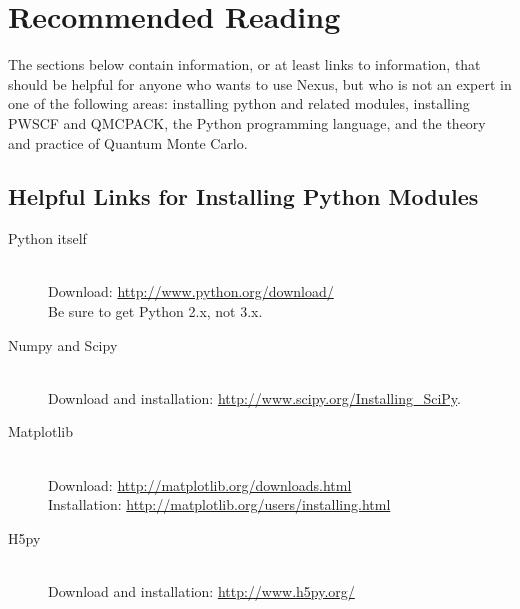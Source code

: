 \documentclass[oneside,11pt]{memoir}
\numberwithin{equation}{section}
\newcommand{\bu}[1]{\textbf{\underline{#1}}}
\begin{document}






\pagebreak
\chapter{Recommended Reading} \label{sec:reading}
The sections below contain information, or at least links to information, 
that should be helpful for anyone who wants to use Nexus, but who 
is not an expert in one of the following areas: installing python and related 
modules, installing PWSCF and QMCPACK, the Python programming language, and 
the theory and practice of Quantum Monte Carlo.  


\section{Helpful Links for Installing Python Modules} \label{sec:install_python}
\begin{description}
  \item[Python itself] \hfill \\
    Download: \url{http://www.python.org/download/}\\  
    Be sure to get Python 2.x, not 3.x.
  \item[Numpy and Scipy] \hfill \\
    Download and installation: \url{http://www.scipy.org/Installing_SciPy}.
  \item[Matplotlib] \hfill \\
    Download: \url{http://matplotlib.org/downloads.html}\\
    Installation: \url{http://matplotlib.org/users/installing.html}
  \item[H5py] \hfill \\
    Download and installation: \url{http://www.h5py.org/}
\end{description}
\end{document}
